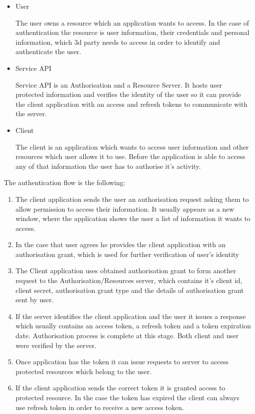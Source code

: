 \documentclass[thesis=M,english]{FITthesis}[2012/10/20]
\begin{document}
\begin{itemize}

\item User

The user owns a resource which an application wants to access. In the case of authentication the resource is user information, their credentials and personal information, which 3d party needs to access in order to identify and authenticate the user.

\item Service API

Service API is an Authorisation and a Resource Server. It hosts user protected information and verifies the identity of the user so it can provide the client application with an access and refresh tokens to communicate with the server.

\item Client

The client is an application which wants to access user information and other resources which user allows it to use. Before the application is able to access any of that information the user has to authorise it's activity.

\end{itemize}

The authentication flow is the following:

\begin{enumerate}
\item The client application sends the user an authorisation request asking them to allow permission to access their information. It usually appears as a new window, where the application shows the user a list of information it wants to access.
\item In the case that user agrees he provides the client application with an authorisation grant, which is used for further verification of user's identity
\item The Client application uses obtained authorisation grant to form another request to the Authorisation/Resources server, which contains it's client id, client secret, authorisation grant type and the details of authorisation grant sent by user.
\item If the server identifies the client application and the user it issues a response which usually contains an access token, a refresh token and a token expiration date. Authorisation process is complete at this stage. Both client and user were verified by the server.
\item Once application has the token it can issue requests to server to access protected resources which belong to the user.
\item If the client application sends the correct token it is granted access to protected resource. In the case the token has expired the client can always use refresh token in order to receive a new access token.
\end{enumerate}
\end{document}
